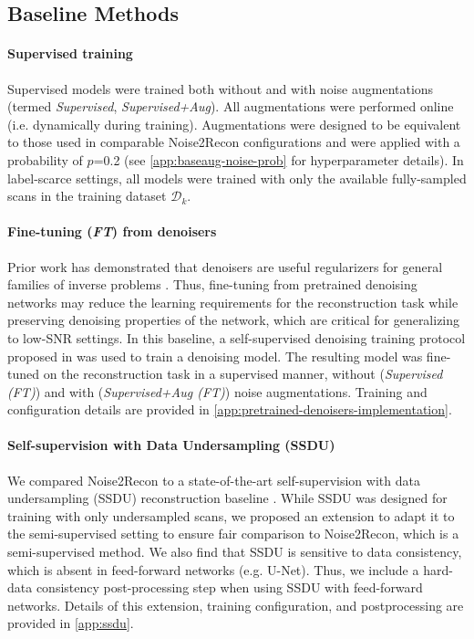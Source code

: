 \documentclass[10pt,twocolumn,letterpaper]{article}
\newcommand{\RV}[1]{{#1}}
\begin{document}
\subsection{Baseline Methods}
\label{sec:methods-baseline}

\paragraph{Supervised training} Supervised models were trained both without and with noise augmentations (termed \textit{Supervised}, \textit{Supervised+Aug}). All augmentations were performed online (i.e. dynamically during training). Augmentations were designed to be equivalent to those used in comparable Noise2Recon configurations and were applied with a probability of $p$=0.2 (see \cref{app:baseaug-noise-prob} for hyperparameter details). In label-scarce settings, all models were trained with only the available fully-sampled scans in the training dataset $\mathcal{D}_k$.

\paragraph{Fine-tuning (\textit{FT}) from denoisers} \RV{Prior work has demonstrated that denoisers are useful regularizers for general families of inverse problems \cite{romano2017little, lehtinen2018noise2noise, mataev_2019_deepred, reehorst_2019_regularization}. Thus, fine-tuning from pretrained denoising networks may reduce the learning requirements for the reconstruction task while preserving denoising properties of the network, which are critical for generalizing to low-SNR settings. In this baseline, a self-supervised denoising training protocol proposed in \cite{batson2019noise2self} was used to train a denoising model. The resulting model was  fine-tuned on the reconstruction task in a supervised manner, without (\textit{Supervised (FT)}) and with (\textit{Supervised+Aug (FT)}) noise augmentations. Training and configuration details are provided in \cref{app:pretrained-denoisers-implementation}.}

\paragraph{Self-supervision with Data Undersampling (SSDU)} We compared Noise2Recon to a state-of-the-art self-supervision with data undersampling (SSDU) reconstruction baseline \cite{Yaman_self}. While SSDU was designed for training with only undersampled scans, we proposed an extension to adapt it to the semi-supervised setting to ensure fair comparison to Noise2Recon, which is a semi-supervised method. \RV{We also find that SSDU is sensitive to data consistency, which is absent in feed-forward networks (e.g. U-Net). Thus, we include a hard-data consistency post-processing step when using SSDU with feed-forward networks.} Details of this extension, training configuration, and postprocessing are provided in \cref{app:ssdu}.
\end{document}

